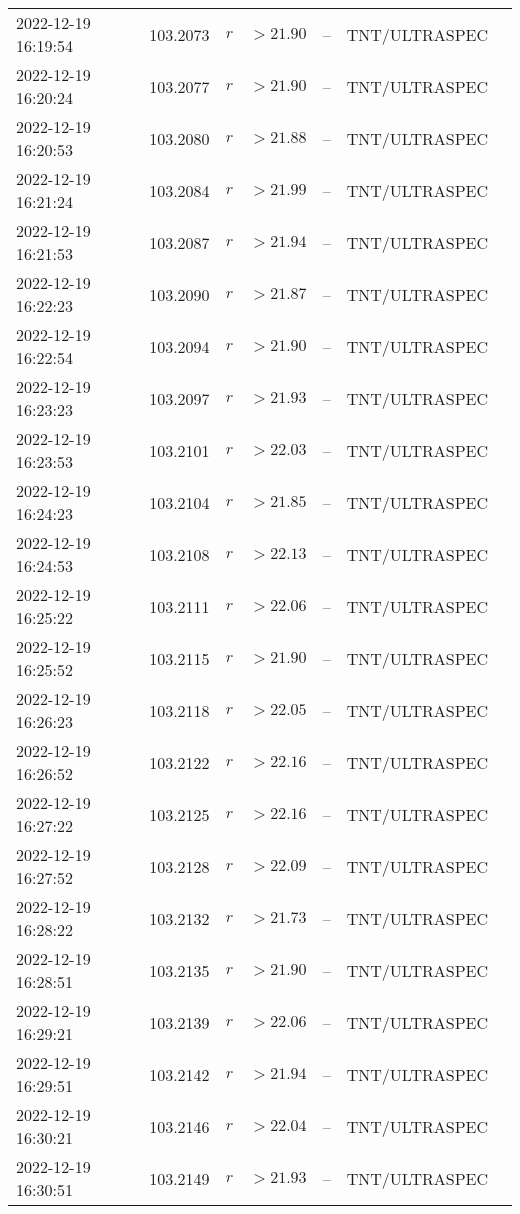 \documentclass{nature_plusfigure}
\begin{document}
\begin{supplement}
\begin{center}
\begin{longtable}{lllllll}
2022-12-19 16:19:54 & 103.2073 & $r$ & $>21.90$ & -- & TNT/ULTRASPEC &  \\ 
2022-12-19 16:20:24 & 103.2077 & $r$ & $>21.90$ & -- & TNT/ULTRASPEC &  \\ 
2022-12-19 16:20:53 & 103.2080 & $r$ & $>21.88$ & -- & TNT/ULTRASPEC &  \\ 
2022-12-19 16:21:24 & 103.2084 & $r$ & $>21.99$ & -- & TNT/ULTRASPEC &  \\ 
2022-12-19 16:21:53 & 103.2087 & $r$ & $>21.94$ & -- & TNT/ULTRASPEC &  \\ 
2022-12-19 16:22:23 & 103.2090 & $r$ & $>21.87$ & -- & TNT/ULTRASPEC &  \\ 
2022-12-19 16:22:54 & 103.2094 & $r$ & $>21.90$ & -- & TNT/ULTRASPEC &  \\ 
2022-12-19 16:23:23 & 103.2097 & $r$ & $>21.93$ & -- & TNT/ULTRASPEC &  \\ 
2022-12-19 16:23:53 & 103.2101 & $r$ & $>22.03$ & -- & TNT/ULTRASPEC &  \\ 
2022-12-19 16:24:23 & 103.2104 & $r$ & $>21.85$ & -- & TNT/ULTRASPEC &  \\ 
2022-12-19 16:24:53 & 103.2108 & $r$ & $>22.13$ & -- & TNT/ULTRASPEC &  \\ 
2022-12-19 16:25:22 & 103.2111 & $r$ & $>22.06$ & -- & TNT/ULTRASPEC &  \\ 
2022-12-19 16:25:52 & 103.2115 & $r$ & $>21.90$ & -- & TNT/ULTRASPEC &  \\ 
2022-12-19 16:26:23 & 103.2118 & $r$ & $>22.05$ & -- & TNT/ULTRASPEC &  \\ 
2022-12-19 16:26:52 & 103.2122 & $r$ & $>22.16$ & -- & TNT/ULTRASPEC &  \\ 
2022-12-19 16:27:22 & 103.2125 & $r$ & $>22.16$ & -- & TNT/ULTRASPEC &  \\ 
2022-12-19 16:27:52 & 103.2128 & $r$ & $>22.09$ & -- & TNT/ULTRASPEC &  \\ 
2022-12-19 16:28:22 & 103.2132 & $r$ & $>21.73$ & -- & TNT/ULTRASPEC &  \\ 
2022-12-19 16:28:51 & 103.2135 & $r$ & $>21.90$ & -- & TNT/ULTRASPEC &  \\ 
2022-12-19 16:29:21 & 103.2139 & $r$ & $>22.06$ & -- & TNT/ULTRASPEC &  \\ 
2022-12-19 16:29:51 & 103.2142 & $r$ & $>21.94$ & -- & TNT/ULTRASPEC &  \\ 
2022-12-19 16:30:21 & 103.2146 & $r$ & $>22.04$ & -- & TNT/ULTRASPEC &  \\ 
2022-12-19 16:30:51 & 103.2149 & $r$ & $>21.93$ & -- & TNT/ULTRASPEC &  \\ 

\end{longtable}
\end{center}
\end{supplement}
\end{document}
